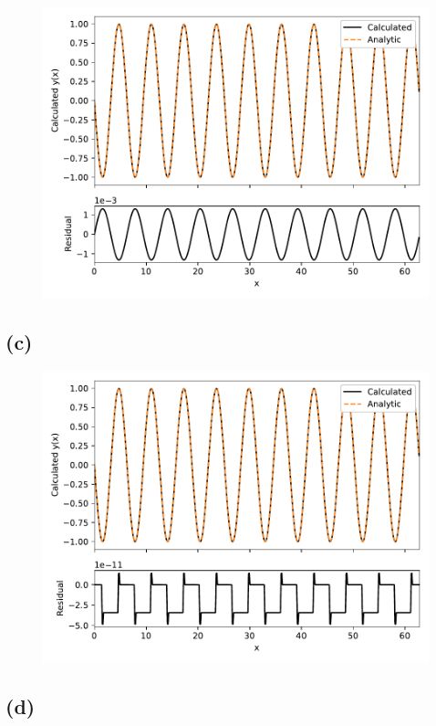 \documentclass[12pt]{article}
\begin{document}
\begin{figure}[H]
    \centering
    \includegraphics[scale=1]{eulerPC}
    \label{fig:eulerPC}
\end{figure}

\subsection*{(c)}

\begin{figure}[H]
    \centering
    \includegraphics[scale=1]{odeint}
    \label{fig:odeint}
\end{figure}

\subsection*{(d)}
\end{document}
